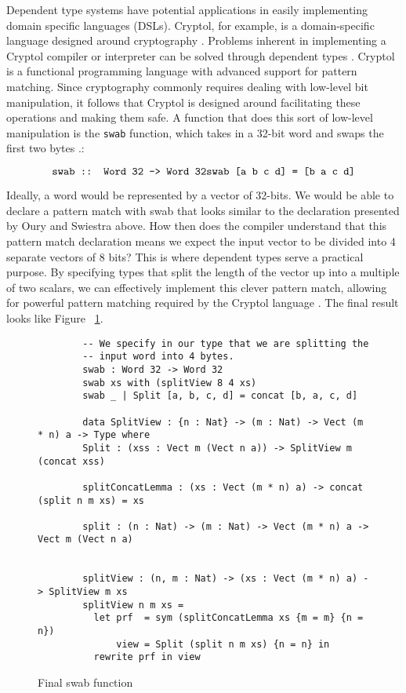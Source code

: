 Dependent type systems have potential applications in easily implementing domain
specific languages (DSLs). Cryptol, for example, is a domain-specific language
designed around cryptography \cite{cryptol_manual}. Problems inherent in
implementing a Cryptol compiler or interpreter can be solved through dependent
types \cite{power_of_pi}. Cryptol is a functional programming language with
advanced support for pattern matching. Since cryptography commonly requires
dealing with low-level bit manipulation, it follows that Cryptol is designed
around facilitating these operations and making them safe. A function that does
this sort of low-level manipulation is the \texttt{swab} function, which takes
in a 32-bit word and swaps the first two bytes \cite{cryptol_manual}.: 

$$
\texttt{swab :: Word 32 -> Word 32} \\
\texttt{swab [a b c d] = [b a c d]} $$

Ideally, a word would be represented by a vector of 32-bits. We would be able to
declare a pattern match with swab that looks similar to the declaration
presented by Oury and Swiestra above. How then does the compiler understand that
this pattern match declaration means we expect the input vector to be divided
into 4 separate vectors of 8 bits? This is where dependent types serve a
practical purpose. By specifying types that split the length of the vector up
into a multiple of two scalars, we can effectively implement this clever pattern
match, allowing for powerful pattern matching required by the Cryptol language
\cite{power_of_pi}. The final result looks like Figure ~\ref{swab}. 

\begin{figure}[ht!]
    \caption{Final swab function \protect\cite{power_of_pi}}
    \label{swab}
    \begin{lstlisting}
        -- We specify in our type that we are splitting the
        -- input word into 4 bytes. 
        swab : Word 32 -> Word 32
        swab xs with (splitView 8 4 xs)
        swab _ | Split [a, b, c, d] = concat [b, a, c, d]

        data SplitView : {n : Nat} -> (m : Nat) -> Vect (m * n) a -> Type where
        Split : (xss : Vect m (Vect n a)) -> SplitView m (concat xss)
        
        splitConcatLemma : (xs : Vect (m * n) a) -> concat (split n m xs) = xs
        
        split : (n : Nat) -> (m : Nat) -> Vect (m * n) a -> Vect m (Vect n a)


        splitView : (n, m : Nat) -> (xs : Vect (m * n) a) -> SplitView m xs
        splitView n m xs =
          let prf  = sym (splitConcatLemma xs {m = m} {n = n})
              view = Split (split n m xs) {n = n} in
          rewrite prf in view
    \end{lstlisting}
\end{figure}

